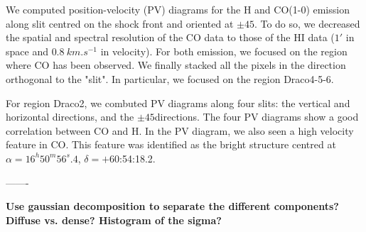 \documentclass[traditabstract]{aa}
\begin{document}
   We computed position-velocity (PV) diagrams for the H and CO(1-0) emission along slit centred on the shock front and oriented at $\pm 45$\degree. To do so, we decreased the spatial and spectral resolution of the CO data to those of the HI data ($1'$ in space and $0.8\: km.s^{-1}$ in velocity). For both emission, we focused on the region where CO has been observed. We finally stacked all the pixels in the direction orthogonal to the "slit".%
In particular, we focused on the region Draco4-5-6. 

   For region Draco2, we combuted PV diagrams along four slits: the vertical and horizontal directions, and the $\pm 45$\degree directions. The four PV diagrams show a good correlation between CO and H. In the PV diagram, we also seen a high velocity feature in CO. This feature was identified as the bright structure centred at $\alpha=16^h 50^m 56^s.4$, $\delta=+$60:54:18.2.

-------

\textbf{Use gaussian decomposition to separate the different components? Diffuse vs. dense? Histogram of the sigma?}


\clearpage

\end{document}
